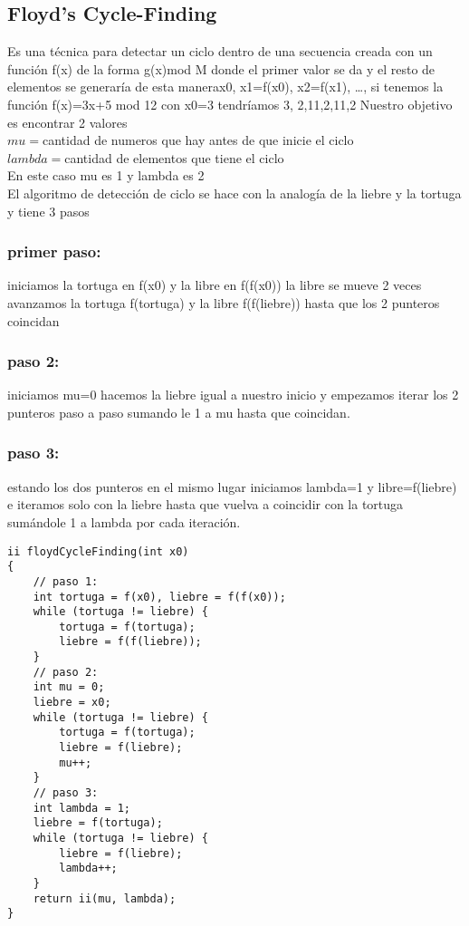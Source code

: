 \subsection{Floyd’s Cycle-Finding}
Es una técnica para detectar un ciclo dentro de una secuencia creada con un función f(x) de la forma g(x)mod M
donde el primer valor se da y el resto de elementos  se generaría de esta manera{x0, x1=f(x0), x2=f(x1),  …},
si tenemos la función f(x)=3x+5 mod 12 con x0=3 tendríamos {3, 2,11,2,11,2} Nuestro objetivo es encontrar 2 valores
\\$mu = $cantidad de numeros que hay antes de que inicie el ciclo
\\$lambda = $cantidad de elementos que tiene el ciclo
\\En este caso mu es 1 y lambda es 2
\\El algoritmo de detección de ciclo se hace con la analogía de la liebre y la tortuga y tiene 3 pasos
\subsubsection{primer paso:}
iniciamos la  tortuga en f(x0) y la libre en f(f(x0)) la libre se mueve 2 veces avanzamos la tortuga f(tortuga) y la libre f(f(liebre)) hasta que los 2 punteros coincidan
\subsubsection{paso 2:}
iniciamos mu=0 hacemos la liebre igual a nuestro inicio y empezamos iterar los 2 punteros paso a paso sumando le 1 a mu hasta que coincidan.
\subsubsection{paso 3:}
estando los dos punteros en el mismo lugar iniciamos lambda=1 y libre=f(liebre)
e iteramos solo con la liebre hasta que vuelva a coincidir con la tortuga sumándole 1 a lambda por cada iteración.
\begin{minipage}{\textwidth}
\begin{lstlisting}[style=C,caption=floydCycleFinding.cpp]
ii floydCycleFinding(int x0)
{
    // paso 1:
    int tortuga = f(x0), liebre = f(f(x0));
    while (tortuga != liebre) {
        tortuga = f(tortuga);
        liebre = f(f(liebre));
    }
    // paso 2:
    int mu = 0;
    liebre = x0;
    while (tortuga != liebre) {
        tortuga = f(tortuga);
        liebre = f(liebre);
        mu++;
    }
    // paso 3:
    int lambda = 1;
    liebre = f(tortuga);
    while (tortuga != liebre) {
        liebre = f(liebre);
        lambda++;
    }
    return ii(mu, lambda);
}
\end{lstlisting}
\end{minipage}
